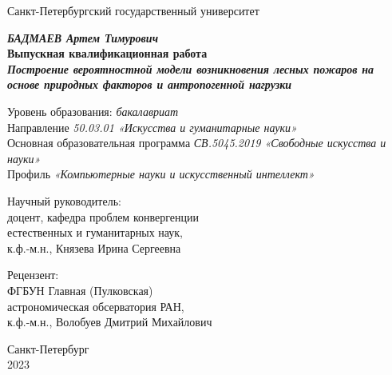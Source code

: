 \begin{titlepage}
\begin{small}
\begin{center}

{Санкт-Петербургский государственный университет}

\vspace{30mm}

\textbf{\textit{БАДМАЕВ Артем Тимурович}} \\[8mm]
\textbf{Выпускная квалификационная работа}\\[3mm]
\textbf{\textit{Построение вероятностной модели возникновения лесных пожаров на основе природных факторов и антропогенной нагрузки}}

\vspace{20mm}
Уровень образования: \textit{бакалавриат}\\
Направление \textit{50.03.01 «Искусства и гуманитарные науки»}\\
Основная образовательная программа \textit{СВ.5045.2019 «Свободные искусства и науки»}\\
Профиль \textit{«Компьютерные науки и искусственный интеллект»}\\[25mm]


\begin{flushright}
\begin{minipage}[t]{0.55\textwidth}
{Научный руководитель:} \\
доцент, кафедра проблем конвергенции \\естественных и гуманитарных наук, \\к.ф.-м.н., Князева Ирина Сергеевна

\vspace{10mm}

{Рецензент:} \\
ФГБУН Главная (Пулковская)\\ астрономическая обсерватория РАН, \\к.ф.-м.н., Волобуев Дмитрий Михайлович
\end{minipage}
\end{flushright}

\vfill 

{Санкт-Петербург}
\\{2023}
\end{center}
\end{small}
\end{titlepage}
\restoregeometry
\addtocounter{page}{1}
